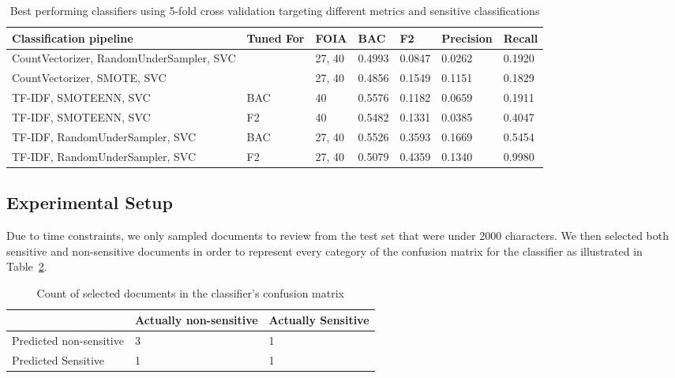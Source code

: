 \documentclass[\version]{l4proj}
\begin{document}
\begin{table}[H]
    \begin{adjustbox}{width=\textwidth,center}
        \begin{tabular}{l|llllll}
            Classification pipeline                  & Tuned For & FOIA   & BAC    & F2     & Precision & Recall \\ \hline
            CountVectorizer, RandomUnderSampler, SVC &           & 27, 40 & 0.4993 & 0.0847 & 0.0262    & 0.1920 \\
            CountVectorizer, SMOTE, SVC              &           & 27, 40 & 0.4856 & 0.1549 & 0.1151    & 0.1829 \\
            TF-IDF, SMOTEENN, SVC                    & BAC       & 40     & 0.5576 & 0.1182 & 0.0659    & 0.1911 \\
            TF-IDF, SMOTEENN, SVC                    & F2        & 40     & 0.5482 & 0.1331 & 0.0385    & 0.4047 \\
            TF-IDF, RandomUnderSampler, SVC          & BAC       & 27, 40 & 0.5526 & 0.3593 & 0.1669    & 0.5454 \\
            TF-IDF, RandomUnderSampler, SVC          & F2        & 27, 40 & 0.5079 & 0.4359 & 0.1340    & 0.9980 \\
        \end{tabular}
    \end{adjustbox}
    \caption{Best performing classifiers using 5-fold cross validation targeting different metrics and sensitive classifications}\label{tab:clf_perf}
\end{table}


\subsection{Experimental Setup}

Due to time constraints, we only sampled documents to review from the test set that were under 2000 characters.
We then selected both sensitive and non-sensitive documents in order to represent every category of the confusion matrix for the classifier as illustrated in Table~\ref{tab:confusion-matrix-selection}.

\begin{table}[H]
    \centering
    \begin{tabular}{l|ll}
                                & Actually non-sensitive & Actually Sensitive \\ \hline
        Predicted non-sensitive & 3                      & 1                  \\
        Predicted Sensitive     & 1                      & 1
    \end{tabular}
    \caption{Count of selected documents in the classifier's confusion matrix}\label{tab:confusion-matrix-selection}
\end{table}
\end{document}
